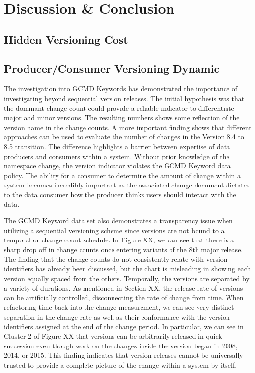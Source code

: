 \chapter{Discussion \& Conclusion}

\section{Hidden Versioning Cost}

\section{Producer/Consumer Versioning Dynamic}

The investigation into GCMD Keywords has demonstrated the importance of investigating beyond sequential version releases.  
The initial hypothesis was that the dominant change count could provide a reliable indicator to differentiate major and minor versions.  
The resulting numbers shows some reflection of the version name in the change counts.  
A more important finding shows that different approaches can be used to evaluate the number of changes in the Version 8.4 to 8.5 transition.  
The difference highlights a barrier between expertise of data producers and consumers within a system.  
Without prior knowledge of the namespace change, the version indicator violates the GCMD Keyword data policy.  
The ability for a consumer to determine the amount of change within a system becomes incredibly important as the associated change document dictates to the data consumer how the producer thinks users should interact with the data.

The GCMD Keyword data set also demonstrates a transparency issue when utilizing a sequential versioning scheme since versions are not bound to a temporal or change count schedule.  
In Figure XX, we can see that there is a sharp drop off in change counts once entering variants of the 8th major release.  
The finding that the change counts do not consistently relate with version identifiers has already been discussed, but the chart is misleading in showing each version equally spaced from the others.  
Temporally, the versions are separated by a variety of durations.  As mentioned in Section XX, the release rate of versions can be artificially controlled, disconnecting the rate of change from time.  
When refactoring time back into the change measurement, we can see very distinct separation in the change rate as well as their conformance with the version identifiers assigned at the end of the change period.  
In particular, we can see in Cluster 2 of Figure XX that versions can be arbitrarily released in quick succession even though work on the changes inside the version began in 2008, 2014, or 2015.  
This finding indicates that version releases cannot be universally trusted to provide a complete picture of the change within a system by itself.

